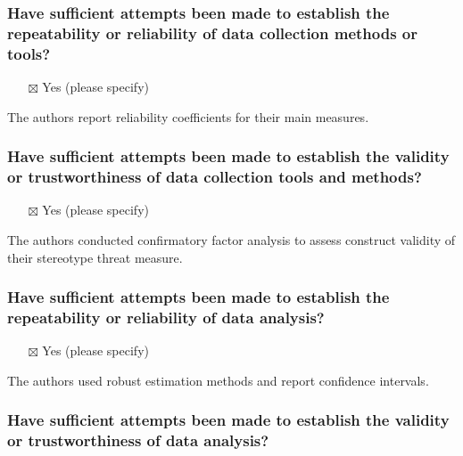 \documentclass[
  doc, a4paper]{apa7}
\providecommand{\tightlist}{%
  \setlength{\itemsep}{0pt}\setlength{\parskip}{0pt}}
\begin{document}
\subsubsection{Have sufficient attempts been made to establish the repeatability or reliability of data collection methods or tools?}\label{have-sufficient-attempts-been-made-to-establish-the-repeatability-or-reliability-of-data-collection-methods-or-tools}

\begin{itemize}
\tightlist
\item[$\boxtimes$]
  Yes (please specify)
\end{itemize}

The authors report reliability coefficients for their main measures.

\subsubsection{Have sufficient attempts been made to establish the validity or trustworthiness of data collection tools and methods?}\label{have-sufficient-attempts-been-made-to-establish-the-validity-or-trustworthiness-of-data-collection-tools-and-methods}

\begin{itemize}
\tightlist
\item[$\boxtimes$]
  Yes (please specify)
\end{itemize}

The authors conducted confirmatory factor analysis to assess construct validity of their stereotype threat measure.

\subsubsection{Have sufficient attempts been made to establish the repeatability or reliability of data analysis?}\label{have-sufficient-attempts-been-made-to-establish-the-repeatability-or-reliability-of-data-analysis}

\begin{itemize}
\tightlist
\item[$\boxtimes$]
  Yes (please specify)
\end{itemize}

The authors used robust estimation methods and report confidence intervals.

\subsubsection{Have sufficient attempts been made to establish the validity or trustworthiness of data analysis?}\label{have-sufficient-attempts-been-made-to-establish-the-validity-or-trustworthiness-of-data-analysis}
\end{document}
